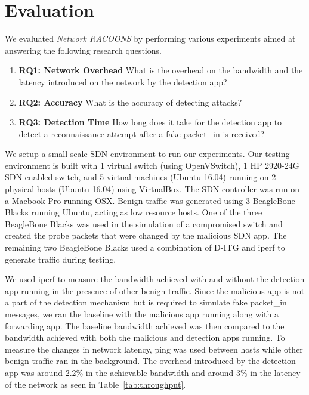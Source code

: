 \section{Evaluation}
\label{sec:eval}



We evaluated \textit{Network RACOONS} by performing various experiments
aimed at answering the following research questions. 

\begin{enumerate}	
  \item \textbf{RQ1: Network Overhead} What is the overhead on the
  bandwidth and the latency introduced on the network by the detection
  app?
  \item \textbf{RQ2: Accuracy} What is the accuracy of detecting attacks?
  \item \textbf{RQ3: Detection Time} How long does it take for the
  detection app to detect a reconnaissance attempt after a fake packet\_in
  is received?
\end{enumerate}

We setup a small scale SDN environment to run our experiments. Our
testing environment is built with 1 virtual switch (using OpenVSwitch),
1 HP 2920-24G SDN enabled switch, and 5 virtual machines (Ubuntu 16.04) 
running on 2 physical hosts (Ubuntu 16.04) using VirtualBox. The SDN 
controller was run on a Macbook Pro running OSX. Benign traffic was
generated using 3 BeagleBone Blacks running Ubuntu, acting as low 
resource hosts. One of the three BeagleBone Blacks was used in the
simulation of a compromised switch and created the probe packets that
were changed by the malicious SDN app. The remaining two BeagleBone
Blacks  used a combination of D-ITG and iperf to generate traffic during
testing.




 We used iperf to measure the bandwidth
achieved with and without the detection app running in the presence of
other benign traffic. Since the malicious app is not a part of the
detection mechanism but is required to simulate fake packet\_in messages,
we ran the baseline with the malicious app running along with a 
forwarding app. The baseline bandwidth achieved was then compared to the
bandwidth achieved with both the malicious and detection apps running. To
measure the changes in network latency, ping was used between hosts
while other benign traffic ran in the background. The overhead introduced
by the detection app was around 2.2\% in the achievable bandwidth and 
around 3\% in the latency of the network as seen in 
Table~\ref{tab:throughput}.


